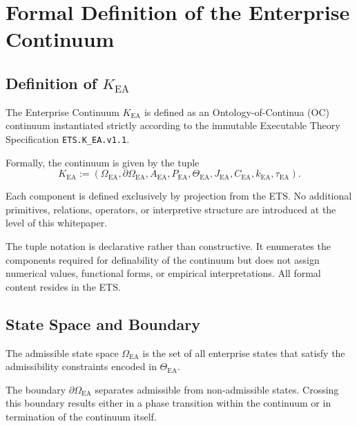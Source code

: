
\section{Formal Definition of the Enterprise Continuum}

\subsection{Definition of $K_{\mathrm{EA}}$}

The Enterprise Continuum $K_{\mathrm{EA}}$ is defined as an
Ontology-of-Continua (OC) continuum instantiated strictly according to
the immutable Executable Theory Specification
\texttt{ETS.K\_EA.v1.1}.

Formally, the continuum is given by the tuple
\[
K_{\mathrm{EA}} :=
\left(
\Omega_{\mathrm{EA}},
\partial\Omega_{\mathrm{EA}},
A_{\mathrm{EA}},
P_{\mathrm{EA}},
\Theta_{\mathrm{EA}},
J_{\mathrm{EA}},
C_{\mathrm{EA}},
k_{\mathrm{EA}},
\tau_{\mathrm{EA}}
\right).
\]

Each component is defined exclusively by projection from the ETS.
No additional primitives, relations, operators, or interpretive
structure are introduced at the level of this whitepaper.

The tuple notation is declarative rather than constructive.
It enumerates the components required for definability of the continuum
but does not assign numerical values, functional forms, or empirical
interpretations.
All formal content resides in the ETS.

\subsection{State Space and Boundary}

The admissible state space $\Omega_{\mathrm{EA}}$ is the set of all
enterprise states that satisfy the admissibility constraints encoded in
$\Theta_{\mathrm{EA}}$.

The boundary $\partial\Omega_{\mathrm{EA}}$ separates admissible from
non-admissible states.
Crossing this boundary results either in a phase transition within the
continuum or in termination of the continuum itself.

